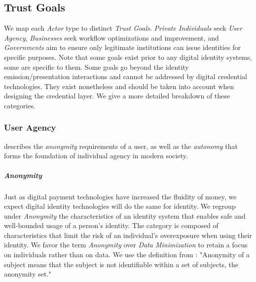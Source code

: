 \subsection{Trust Goals}
\label{subsub:trust_goals}

\vspace{1em}


We map each \emph{Actor} type to distinct \emph{Trust Goals}. \emph{Private Individuals} seek \emph{User Agency}, \emph{Businesses} seek workflow optimizations and improvement, and \emph{Governments} aim to ensure only legitimate institutions can issue identities for specific purposes.
Note that some goals exist prior to any digital identity systems, some are specific to them. Some goals go beyond the identity emission/presentation interactions and cannot be addressed by digital credential technologies. 
They exist nonetheless and should be taken into account when designing the credential layer. We give a more detailed breakdown of these categories.


\subsubsection{User Agency} describes the \emph{anonymity} requirements of a user, as well as the \emph{autonomy} that forms the foundation of individual agency in modern society.

\subparagraph{Anonymity} Just as digital payment technologies have increased the fluidity of money, we expect digital identity technologies will do the same for identity. We regroup under \emph{Anonymity} the characteristics of an identity system that enables safe and well-bounded usage of a person's identity. The category is composed of characteristics that limit the risk of an individual's overexposure when using their identity. We favor the term \emph{Anonymity} over \emph{Data Minimization} to retain a focus on individuals rather than on data. We use the definition from \cite{ph10}: "Anonymity of a subject means that the subject is not identifiable within a set of
subjects, the anonymity set."

